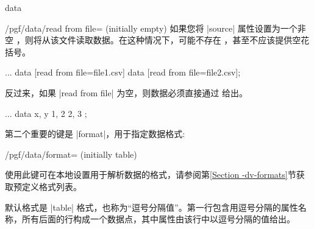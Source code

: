 \begin{datavisualizationoperation}{data}{}
\begin{key}{/pgf/data/read from file= (initially \normalfont empty)}
        如果您将 |source| 属性设置为一个非空 ，则将从该文件读取数据。在这种情况下，可能不存在 ，甚至不应该提供空花括号。
\begin{codeexample}
\datavisualization ...
  data [read from file=file1.csv]
  data [read from file=file2.csv];
\end{codeexample}
        反过来，如果 |read from file| 为空，则数据必须直接通过  给出。
\begin{codeexample}
\datavisualization ...
  data {
    x, y
    1, 2
    2, 3
  };
\end{codeexample}
    \end{key}
    第二个重要的键是 |format|，用于指定数据格式:
    \begin{key}{/pgf/data/format= (initially table)} %

        使用此键可在本地设置用于解析数据的格式，请参阅第\ref{Section -dv-formats}节获取预定义格式列表。


        默认格式是 |table| 格式，也称为``逗号分隔值''。第一行包含用逗号分隔的属性名称，所有后面的行构成一个数据点，其中属性由该行中以逗号分隔的值给出。
    \end{key}


    \medskip


\end{datavisualizationoperation}
